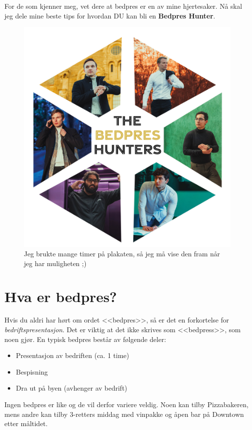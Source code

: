 For de som kjenner meg, vet dere at bedpres er en av mine hjertesaker. Nå skal jeg dele mine beste tips for hvordan DU kan bli en \textbf{\large Bedpres Hunter}.

\begin{figure}[H]
    \centering    
    \includegraphics[width=0.7\linewidth]{images/BedpresHunters.jpg}
    \caption{Jeg brukte mange timer på plakaten, så jeg må vise den fram når jeg har muligheten ;)}
    \label{fig:bedpres}
\end{figure}




\section{Hva er bedpres?}

Hvis du aldri har hørt om ordet <<bedpres>>, så er det en forkortelse for \textit{bedriftspresentasjon}. Det er viktig at det ikke skrives som <<bedpress>>, som noen gjør. En typisk bedpres består av følgende deler:

\begin{itemize}
    \item Presentasjon av bedriften (ca. 1 time)
    \item Bespisning 
    \item Dra ut på byen (avhenger av bedrift)
\end{itemize}

Ingen bedpres er like og de vil derfor variere veldig. Noen kan tilby Pizzabakeren, mens andre kan tilby 3-retters middag med vinpakke og åpen bar på Downtown etter måltidet. 




